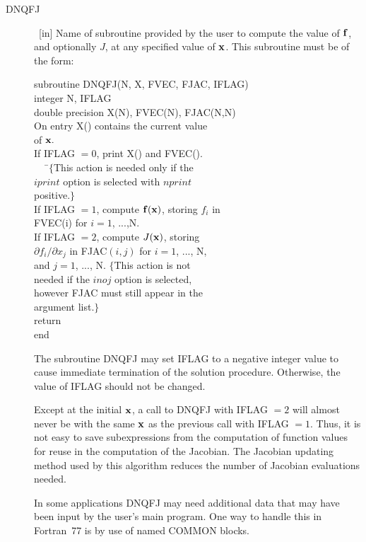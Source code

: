 \documentclass[twoside]{MATH77}
\begin{document}
\begin{description}
\item[DNQFJ]  \ [in] Name of subroutine provided by the user to compute the
value of ${\bf f}$, and optionally $J$, at any specified value of ${\bf x}$.
This subroutine must be of the form:
{\tt \begin{tabbing}
subroutine DNQFJ(N, X, FVEC, FJAC, IFLAG)\\
integer N, IFLAG\\
double precision X(N), FVEC(N), FJAC(N,N)\\
On entry X() contains the current value\\
of ${\bf x}.$\\
If IFLAG $= 0$, print X() and FVEC().\\
\ \ \ \=$\{$This action is needed only if the\\
\>$iprint$ option is selected with $nprint$\\
\>positive$.\}$\\
If IFLAG $= 1$, compute ${\bf f}({\bf x})$, storing $f_i$ in\\
\>FVEC(i) for $i = 1$, ...,N.\\
If IFLAG $= 2$, compute $J({\bf x})$, storing\\
\>$\partial f_i/\partial x_j$ in FJAC$(i,j)$ for $i = 1$, ..., N,\\
\>and $j = 1$, ..., N. $\{$This action is not\\
\>needed if the $inoj$ option is selected,\\
\>however FJAC must still appear in the\\
\>argument list$.\}$\\
return\\
end
\end{tabbing}}
The subroutine DNQFJ may set IFLAG to a negative integer value to cause
immediate termination of the solution procedure. Otherwise, the value of
IFLAG should not be changed.

Except at the initial ${\bf x}$, a call to DNQFJ with IFLAG $=2$ will almost
never be with the same ${\bf x}$ as the previous call with IFLAG $=1$. Thus,
it is not easy to save subexpressions from the computation of function
values for reuse in the computation of the Jacobian. The Jacobian updating
method used by this algorithm reduces the number of Jacobian evaluations
needed.

In some applications DNQFJ may need additional data that may have been input
by the user's main program. One way to handle this in Fortran~77 is by use
of named COMMON blocks.


\end{description}
\end{document}
